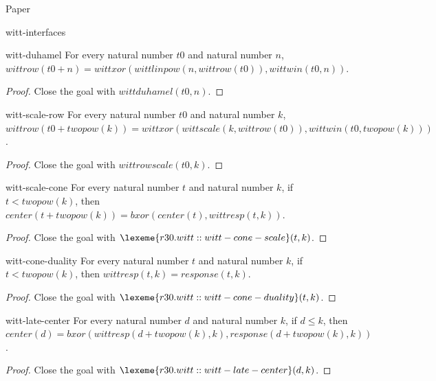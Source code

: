 \begin{lexlean}{Paper}
\begin{section}{witt-interfaces}
  \begin{theorem}{witt-duhamel}
  For every natural number \(t0\) and natural number \(n\), \(wittrow(t0 + n) = wittxor(wittlinpow(n, wittrow(t0)), wittwin(t0, n))\).
  \begin{proof}
  Close the goal with \(wittduhamel(t0, n)\).
  \end{proof}
  \end{theorem}

  \begin{theorem}{witt-scale-row}
  For every natural number \(t0\) and natural number \(k\), \(wittrow(t0 + twopow(k)) = wittxor(wittscale(k, wittrow(t0)), wittwin(t0, twopow(k)))\).
  \begin{proof}
  Close the goal with \(wittrowscale(t0, k)\).
  \end{proof}
  \end{theorem}

  \begin{theorem}{witt-scale-cone}
  For every natural number \(t\) and natural number \(k\), if \(t < twopow(k)\), then \(center(t + twopow(k)) = bxor(center(t), wittresp(t, k))\).
  \begin{proof}
  Close the goal with \(\lexeme{r30.witt::witt-cone-scale}(t, k)\).
  \end{proof}
  \end{theorem}

  \begin{theorem}{witt-cone-duality}
  For every natural number \(t\) and natural number \(k\), if \(t < twopow(k)\), then \(wittresp(t, k) = response(t, k)\).
  \begin{proof}
  Close the goal with \(\lexeme{r30.witt::witt-cone-duality}(t, k)\).
  \end{proof}
  \end{theorem}

  \begin{theorem}{witt-late-center}
  For every natural number \(d\) and natural number \(k\), if \(d ≤ k\), then \(center(d) = bxor(wittresp(d + twopow(k), k), response(d + twopow(k), k))\).
  \begin{proof}
  Close the goal with \(\lexeme{r30.witt::witt-late-center}(d, k)\).
  \end{proof}
  \end{theorem}


\end{section}
\end{lexlean}

